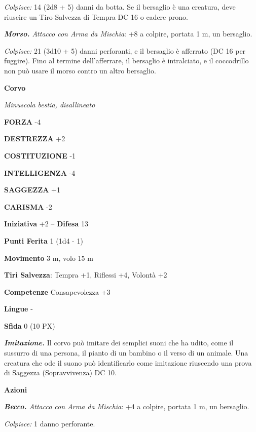 \begin{multicols}{2}
	\textit{Colpisce:} 14 (2d8 + 5) danni da botta. Se il bersaglio è una creatura, deve riuscire un Tiro Salvezza di Tempra DC 16 o cadere prono.

	\textit{\textbf{Morso.} Attacco con Arma da Mischia}: +8 a colpire, portata 1 m, un bersaglio.

	\textit{Colpisce:} 21 (3d10 + 5) danni perforanti, e il bersaglio è afferrato (DC 16 per fuggire). Fino al termine dell'afferrare, il bersaglio è intralciato, e il coccodrillo non può usare il morso contro un altro bersaglio.

	\medskip\textbf{Corvo}

	\textit{Minuscola bestia, disallineato}

	\textbf{FORZA} -4

	\textbf{DESTREZZA} +2

	\textbf{COSTITUZIONE} -1

	\textbf{INTELLIGENZA} -4

	\textbf{SAGGEZZA} +1

	\textbf{CARISMA} -2

	\textbf{Iniziativa} +2 -- \textbf{Difesa} 13

	\textbf{Punti Ferita} 1 (1d4 - 1)

	\textbf{Movimento} 3 m, volo 15 m

	\textbf{Tiri Salvezza}: Tempra +1, Riflessi +4, Volontà +2

	\textbf{Competenze} Consapevolezza +3

	\textbf{Lingue} -

	\textbf{Sfida} 0 (10 PX)

	\textit{\textbf{Imitazione.}} Il corvo può imitare dei semplici suoni che ha udito, come il sussurro di una persona, il pianto di un bambino o il verso di un animale. Una creatura che ode il suono può identificarlo come imitazione riuscendo una prova di Saggezza (Sopravvivenza) DC 10.

	\textbf{Azioni}

	\textit{\textbf{Becco.} Attacco con Arma da Mischia}: +4 a colpire, portata 1 m, un bersaglio.

	\textit{Colpisce:} 1 danno perforante.






\end{multicols}
